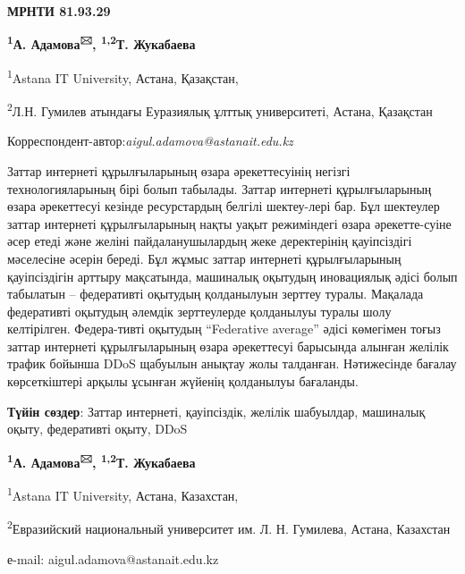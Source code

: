 
\newpage
{\bfseries МРНТИ 81.93.29}


\begin{center}

{\bfseries \textsuperscript{1}А. Адамова\textsuperscript{🖂},
\textsuperscript{1,2}Т. Жукабаева}

\textsuperscript{1}Astana IT University, Астана, Қазақстан,

\textsuperscript{2}Л.Н. Гумилев атындағы Еуразиялық ұлттық университеті,
Астана, Қазақстан
\end{center}
Корреспондент-автор:\emph{aigul.adamova@astanait.edu.kz}


Заттар интернеті құрылғыларының өзара әрекеттесуінің негізгі
технологияларының бірі болып табылады. Заттар интернеті құрылғыларының
өзара әрекеттесуі кезінде ресурстардың белгілі шектеу-лері бар. Бұл
шектеулер заттар интернеті құрылғыларының нақты уақыт режиміндегі өзара
әрекетте-суіне әсер етеді және желіні пайдаланушылардың жеке деректерінің
қауіпсіздігі мәселесіне әсерін береді. Бұл жұмыс заттар интернеті
құрылғыларының қауіпсіздігін арттыру мақсатында, машиналық оқытудың
иновациялық әдісі болып табылатын -- федеративті оқытудың қолданылуын
зерттеу туралы. Мақалада федеративті оқытудың әлемдік зерттеулерде
қолданылуы туралы шолу келтірілген. Федера-тивті оқытудың ``Federative
average'' әдісі көмегімен тоғыз заттар интернеті құрылғыларының өзара
әрекеттесуі барысында алынған желілік трафик бойынша DDoS щабуылын
анықтау жолы талданған. Нәтижесінде бағалау көрсеткіштері арқылы ұсынған
жүйенің қолданылуы бағаланды.

{\bfseries Түйін сөздер}: Заттар интернеті, қауіпсіздік, желілік шабуылдар,
машиналық оқыту, федеративті оқыту, DDoS


\begin{center}
{\bfseries \textsuperscript{1}А. Адамова\textsuperscript{🖂},
\textsuperscript{1,2}Т. Жукабаева}

\textsuperscript{1}Astana IT University, Астана, Казахстан,

\textsuperscript{2}Евразийский национальный университет им. Л. Н.
Гумилева, Астана, Казахстан

е-mail: aigul.adamova@astanait.edu.kz
\end{center}

